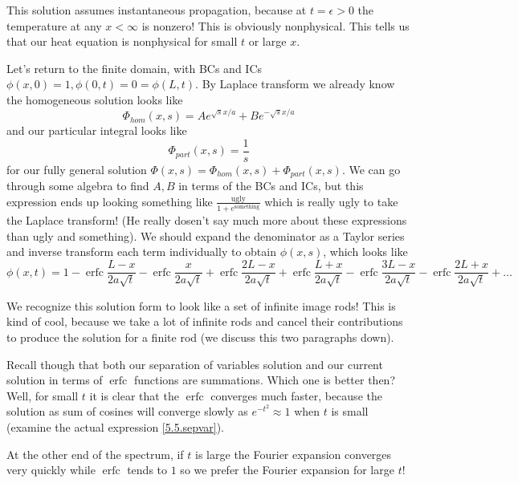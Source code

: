 \documentclass[10pt]{report}
\DeclareMathOperator{\erfc}{erfc}
\begin{document}
This solution assumes instantaneous propagation, because at $t = \epsilon > 0$ the temperature at any $x < \infty$ is nonzero! This is obviously nonphysical. This tells us that our heat equation is nonphysical for small $t$ or large $x$. 

Let's return to the finite domain, with BCs and ICs $\phi(x,0) = 1, \phi(0,t) = 0 = \phi(L,t)$. By Laplace transform we already know the homogeneous solution looks like
\begin{equation}
    \Phi_{hom}(x,s) = Ae^{\sqrt{s}x/a} + Be^{-\sqrt{s}x/a}
\end{equation}
and our particular integral looks like
\begin{equation}
    \Phi_{part}(x,s) = \frac{1}{s}
\end{equation}
for our fully general solution $\Phi(x,s) = \Phi_{hom}(x,s) + \Phi_{part}(x,s)$. We can go through some algebra to find $A,B$ in terms of the BCs and ICs, but this expression ends up looking something like $\frac{\text{ugly}}{1 + e^{\text{something}}}$ which is really ugly to take the Laplace transform! (He really dosen't say much more about these expressions than ugly and something). We should expand the denominator as a Taylor series and inverse transform each term individually to obtain $\phi(x,s)$, which looks like
\begin{equation}
    \phi(x,t) = 1 - \erfc \frac{L-x}{2a\sqrt{t}} - \erfc\frac{x}{2a\sqrt{t}}+ \erfc \frac{2L-x}{2a\sqrt{t}} + \erfc\frac{L + x}{2a\sqrt{t}}- \erfc \frac{3L-x}{2a\sqrt{t}} - \erfc\frac{2L + x}{2a\sqrt{t}}+\dots
\end{equation}

We recognize this solution form to look like a set of infinite image rods! This is kind of cool, because we take a lot of infinite rods and cancel their contributions to produce the solution for a finite rod (we discuss this two paragraphs down). 

Recall though that both our separation of variables solution and our current solution in terms of $\erfc$ functions are summations. Which one is better then? Well, for small $t$ it is clear that the $\erfc$ converges much faster, because the solution as sum of cosines will converge slowly as $e^{-t^2} \approx 1$ when $t$ is small (examine the actual expression \eqref{5.5.sepvar}).

At the other end of the spectrum, if $t$ is large the Fourier expansion converges very quickly while $\erfc$ tends to $1$ so we prefer the Fourier expansion for large $t$!
\end{document}
